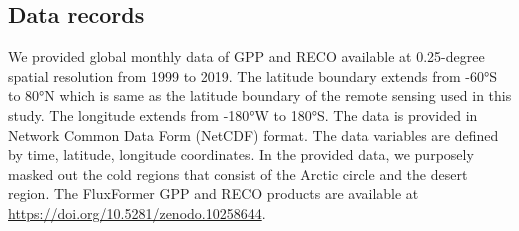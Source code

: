 \subsection{Data records}
We provided global monthly data of GPP and RECO available at 0.25-degree spatial resolution from 1999 to 2019. The latitude boundary extends from -60°S to 80°N which is same as the latitude boundary of the remote sensing used in this study. The longitude extends from -180°W to 180°S. The data is provided in Network Common Data Form (NetCDF) format. The data variables are defined by time, latitude, longitude coordinates. In the provided data, we purposely masked out the cold regions that consist of the Arctic circle and the desert region. The FluxFormer GPP and RECO products are available at \url{https://doi.org/10.5281/zenodo.10258644}.\par

